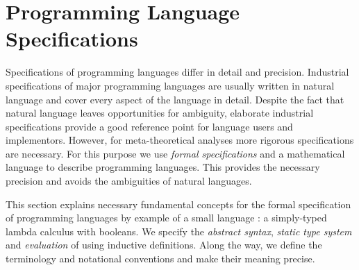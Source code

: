 {%
\section{Programming Language Specifications}\label{sec:intro:specification}


Specifications of programming languages differ in detail and precision.
Industrial specifications of major programming languages are usually written in
natural language and cover every aspect of the language in detail. Despite the
fact that natural language leaves opportunities for ambiguity, elaborate
industrial specifications provide a good reference point for language users and
implementors. However, for meta-theoretical analyses more rigorous
specifications are necessary. For this purpose we use \emph{formal
  specifications} and a mathematical language to describe programming
languages. This provides the necessary precision and avoids the ambiguities of
natural languages.

This section explains necessary fundamental concepts for the formal
specification of programming languages by example of a small language \stlcbool:
a simply-typed lambda calculus with booleans. We specify the \emph{abstract
  syntax}, \emph{static type system} and \emph{evaluation} of \stlcbool using
inductive definitions. Along the way, we define the terminology and notational
conventions and make their meaning precise.

}
